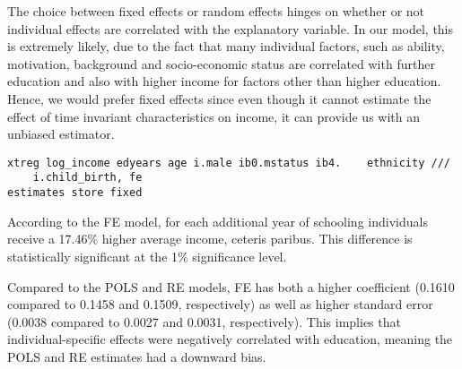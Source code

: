 


The choice between fixed effects or random effects hinges on whether or not individual effects are correlated with the explanatory variable. In our model, this is extremely likely, due to the fact that many individual factors, such as ability, motivation, background and socio-economic status are correlated with further education and also with higher income for factors other than higher education. Hence, we would prefer fixed effects since even though it cannot estimate the effect of time invariant characteristics on income, it can provide us with an unbiased estimator.


\begin{verbatim}
xtreg log_income edyears age i.male ib0.mstatus ib4.    ethnicity ///
    i.child_birth, fe
estimates store fixed
\end{verbatim}


According to the FE model, for each additional year of schooling individuals receive a 17.46\% higher average income, ceteris paribus. This difference is statistically significant at the 1\% significance level.


Compared to the POLS and RE models, FE has both a higher coefficient (0.1610 compared to 0.1458 and 0.1509, respectively) as well as higher standard error (0.0038 compared to 0.0027 and 0.0031, respectively). This implies that individual-specific effects were negatively correlated with education, meaning the POLS and RE estimates had a downward bias.

